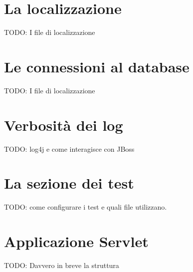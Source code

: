 \section{La localizzazione}
TODO: I file di localizzazione

\section{Le connessioni al database}
TODO: I file di localizzazione


\section{Verbosità dei log}
TODO: log4j e come interagisce con JBoss

\section{La sezione dei test}
TODO: come configurare i test e quali file utilizzano.

\section{Applicazione Servlet}
TODO: Davvero in breve la struttura